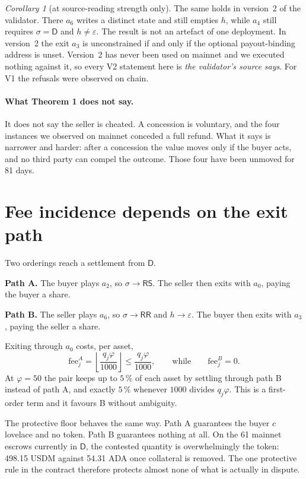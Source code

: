 \documentclass[11pt]{article}
\theoremstyle{remark}
\newtheorem*{corollary}{Corollary}
\newcommand{\RS}{\mathsf{RS}}
\newcommand{\RR}{\mathsf{RR}}
\newcommand{\Dd}{\mathsf{D}}
\begin{document}
\begin{corollary}[at source-reading strength only]
The same holds in version~2 of the validator. There $a_6$ writes a distinct state and still empties $h$, while $a_4$
still requires $\sigma = \Dd$ and $h \neq \varepsilon$. The result is not an artefact of one deployment. In version~2
the exit $a_3$ is unconstrained if and only if the optional payout-binding address is unset. Version~2 has never been
used on mainnet and we executed nothing against it, so every V2 statement here is \emph{the validator's source says}.
For V1 the refusals were observed on chain.
\end{corollary}

\paragraph{What Theorem 1 does not say.} It does not say the seller is cheated. A concession is voluntary, and the
four instances we observed on mainnet conceded a full refund. What it says is narrower and harder: after a concession
the value moves only if the buyer acts, and no third party can compel the outcome. Those four have been unmoved for
81 days.

\section{Fee incidence depends on the exit path}

Two orderings reach a settlement from $\Dd$.

\textbf{Path A.} The buyer plays $a_2$, so $\sigma \to \RS$. The seller then exits with $a_0$, paying the buyer a
share.

\textbf{Path B.} The seller plays $a_6$, so $\sigma \to \RR$ and $h \to \varepsilon$. The buyer then exits with
$a_3$, paying the seller a share.

Exiting through $a_0$ costs, per asset,
\[
\text{fee}^{A}_j = \left\lfloor \frac{q_j \varphi}{1000} \right\rfloor \le \frac{q_j\varphi}{1000},
\qquad\text{while}\qquad \text{fee}^{B}_j = 0 .
\]
At $\varphi = 50$ the pair keeps up to $5\,\%$ of each asset by settling through path B instead of path A, and
exactly $5\,\%$ whenever $1000$ divides $q_j\varphi$. This is a first-order term and it favours B without ambiguity.

The protective floor behaves the same way. Path A guarantees the buyer $c$ lovelace and no token. Path B guarantees
nothing at all. On the 61 mainnet escrows currently in $\Dd$, the contested quantity is overwhelmingly the token:
498.15 USDM against 54.31 ADA once collateral is removed. The one protective rule in the contract therefore protects
almost none of what is actually in dispute.
\end{document}
